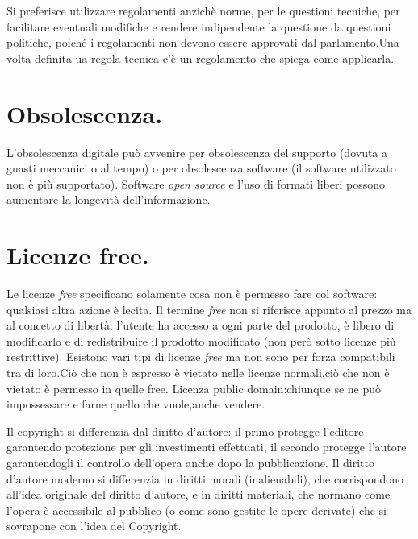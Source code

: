 \documentclass[a4page, 11pt, twocolumn]{article}
\begin{document}
Si preferisce utilizzare regolamenti anzichè norme, per le questioni tecniche, per facilitare eventuali modifiche e rendere indipendente la questione da questioni politiche, poiché i regolamenti non devono essere approvati dal parlamento.Una volta definita ua regola tecnica c'è un regolamento che spiega come applicarla.

\section{Obsolescenza.}
L'obsolescenza digitale può avvenire per obsolescenza del supporto (dovuta a guasti meccanici o al tempo) o per obsolescenza software (il software utilizzato non è più supportato).
Software \textit{open source} e l'uso di formati liberi possono aumentare la longevità dell'informazione.

\section{Licenze free.}
Le licenze \textit{free} specificano solamente cosa non è permesso fare col software: qualsiasi altra azione è lecita.
Il termine \textit{free} non si riferisce appunto al prezzo ma al concetto di libertà: l'utente ha accesso a ogni parte del prodotto, è libero di modificarlo e di redistribuire il prodotto modificato (non però sotto licenze più restrittive).
Esistono vari tipi di licenze \textit{free} ma non sono per forza compatibili tra di loro.Ciò che non è espresso è vietato nelle licenze normali,ciò che non è vietato è permesso in quelle free. 
Licenza public domain:chiunque se ne può impossessare e farne quello che vuole,anche vendere.

Il copyright si differenzia dal diritto d'autore: il primo protegge l'editore garantendo protezione per gli investimenti effettuati, il secondo protegge l'autore garantendogli il controllo dell'opera anche dopo la pubblicazione.
Il diritto d'autore moderno si differenzia in diritti morali (inalienabili), che corrispondono all'idea originale del  diritto d'autore, e in diritti materiali, che normano come l'opera è accessibile al pubblico (o come sono gestite le opere derivate) che si sovrapone con l'idea del Copyright.
\end{document}
